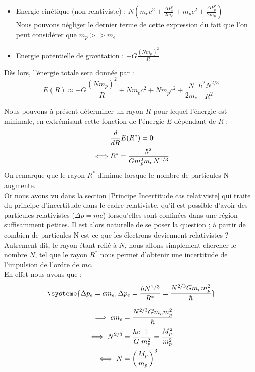 \documentclass[../Notes de cours]{subfiles}
\begin{document}
\begin{itemize}[label = \textbullet]
\item Energie cinétique (non-relativiste) : $N \left( m_e c^2 + \frac{\Delta P_e^2}{2 m_e} + m_p c^2 + \frac{\Delta P_p^2}{2 m_p} \right)$ \\
Nous pouvons négliger le dernier terme de cette expression du fait que l'on peut considérer que $m_p >> m_e$  
\item Energie potentielle de gravitation : $- G \frac{(Nm_p)^2}{R}$ \\
\end{itemize}

Dès lors, l'énergie totale sera donnée par :
\begin{equation}
E(R) \approx - G \frac{(Nm_p)^2}{R} + Nm_e c^2 + Nm_p c^2 + \frac{N}{2m_e} \frac{\hbar^2 N^{2/3}}{R^2}
\end{equation}

Nous pouvons à présent déterminer un rayon $R$ pour lequel l'énergie est minimale, en extrémisant cette fonction de l'énergie $E$ dépendant de $R$ : 
\begin{align}
\label{rayon d'energie minimale étoile}
    &\frac{d}{dR} E(R^*) = 0 \notag \\
    \iff &R^* = \frac{\hbar^2}{Gm_p^2m_eN^{1/3}}
\end{align}
On remarque que le rayon $R^*$ diminue lorsque le nombre de particules N augmente. \\
Or nous avons vu dans la section \ref{Principe Incertitude cas relativiste} qui traite du principe d'incertitude dans le cadre relativiste, qu'il est possible d'avoir des particules relativistes ($\Delta p = mc$) lorsqu'elles sont confinées dans une région suffisamment petites. Il est alors naturelle de se poser la question ; à partir de combien de particules N est-ce que les électrons deviennent relativistes ? Autrement dit, le rayon étant relié à $N$, nous allons simplement chercher le nombre $N$, tel que le rayon $R^*$ nous permet d'obtenir une incertitude de l'impulsion de l'ordre de $mc$.  \\

En effet nous avons que : 
\begin{align}
    \systeme{\Delta p_e = cm_e, \Delta p_e = \frac{\hbar N^{1/3}}{R^*} = \frac{N^{2/3} G m_e m^2_p}{\hbar}}
\end{align}

\begin{align}
    \implies cm_e &= \frac{N^{2/3} G m_e m^2_p}{\hbar} \notag \\
    \iff N^{2/3} &= \frac{\hbar c}{G}\frac{1}{m^2_p} = \frac{M^2_p}{m^2_p} \notag \\
    \iff N &= \left( \frac{M_p}{m_p} \right)^3
\end{align}
\end{document}
